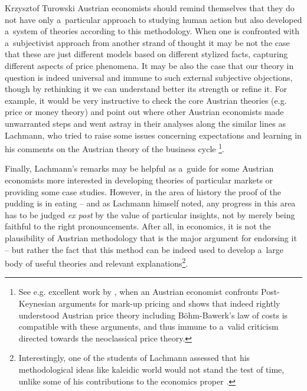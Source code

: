 \begin{artengenv}{Krzysztof Turowski}
Austrian economists should remind themselves that they do not have only a~particular approach to studying human action but also developed a~system of theories according to this methodology.
When one is confronted with a~subjectivist approach from another strand of thought it may be not the case that these are just different models based on different stylized facts, capturing different aspects of price phenomena.
It may be also the case that our theory in question is indeed universal and immune to such external subjective objections, though by rethinking it we can understand better its strength or refine it. For example, it would be very instructive to check the core Austrian theories (e.g. price or money theory) and point out where other Austrian economists made unwarranted steps and went astray in their analyses along the similar lines as Lachmann, who tried to raise some issues concerning expectations and learning in his comments on the Austrian theory of the business cycle \parencite[123--124]{lachmann-expectations}\footnote{See e.g. excellent work by \textcite{machaj-postkeynesian}, when an Austrian economist confronts Post-Keynesian arguments for mark-up pricing and shows that indeed rightly understood Austrian price theory including B\"ohm-Bawerk's law of costs is compatible with these arguments, and thus immune to a~valid criticism directed towards the neoclassical price theory.}.

Finally, Lachmann's remarks may be helpful as a~guide for some Austrian economists more interested in developing theories of particular markets or providing some case studies.
However, in the area of history the proof of the pudding is in eating -- and as Lachmann himself noted, any progress in this area has to be judged \emph{ex post} by the value of particular insights, not by merely being faithful to the right pronouncements.
After all, in economics, it is not the plausibility of Austrian methodology that is the major argument for endorsing it -- but rather the fact that this method can be indeed used to develop a~large body of useful theories and relevant explanations\footnote{Interestingly, one of the students of Lachmann assessed that his methodological ideas like kaleidic world would not stand the test of time, unlike some of his contributions to the economics proper \parencite[388]{boehm2000professor}.}.








\end{artengenv}

\label{turowski-last}